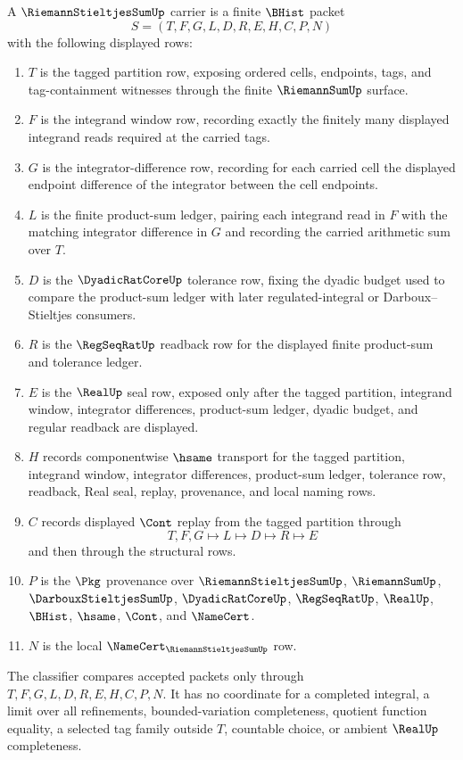 \begin{definition}
\label{def:riemann-stieltjes-sum-carrier}
A $\RiemannStieltjesSumUp$ carrier is a finite $\BHist$ packet
$$
S=(T,F,G,L,D,R,E,H,C,P,N)
$$
with the following displayed rows:
\begin{enumerate}
\item $T$ is the tagged partition row, exposing ordered cells, endpoints, tags, and tag-containment witnesses through the finite $\RiemannSumUp$ surface.
\item $F$ is the integrand window row, recording exactly the finitely many displayed integrand reads required at the carried tags.
\item $G$ is the integrator-difference row, recording for each carried cell the displayed endpoint difference of the integrator between the cell endpoints.
\item $L$ is the finite product-sum ledger, pairing each integrand read in $F$ with the matching integrator difference in $G$ and recording the carried arithmetic sum over $T$.
\item $D$ is the $\DyadicRatCoreUp$ tolerance row, fixing the dyadic budget used to compare the product-sum ledger with later regulated-integral or Darboux--Stieltjes consumers.
\item $R$ is the $\RegSeqRatUp$ readback row for the displayed finite product-sum and tolerance ledger.
\item $E$ is the $\RealUp$ seal row, exposed only after the tagged partition, integrand window, integrator differences, product-sum ledger, dyadic budget, and regular readback are displayed.
\item $H$ records componentwise $\hsame$ transport for the tagged partition, integrand window, integrator differences, product-sum ledger, tolerance row, readback, Real seal, replay, provenance, and local naming rows.
\item $C$ records displayed $\Cont$ replay from the tagged partition through
$$
T,F,G \longmapsto L \longmapsto D \longmapsto R \longmapsto E
$$
and then through the structural rows.
\item $P$ is the $\Pkg$ provenance over $\RiemannStieltjesSumUp$, $\RiemannSumUp$, $\DarbouxStieltjesSumUp$, $\DyadicRatCoreUp$, $\RegSeqRatUp$, $\RealUp$, $\BHist$, $\hsame$, $\Cont$, and $\NameCert$.
\item $N$ is the local $\NameCert_{\RiemannStieltjesSumUp}$ row.
\end{enumerate}
The classifier compares accepted packets only through $T,F,G,L,D,R,E,H,C,P,N$. It has no coordinate for a completed integral, a limit over all refinements, bounded-variation completeness, quotient function equality, a selected tag family outside $T$, countable choice, or ambient $\RealUp$ completeness.
\end{definition}

